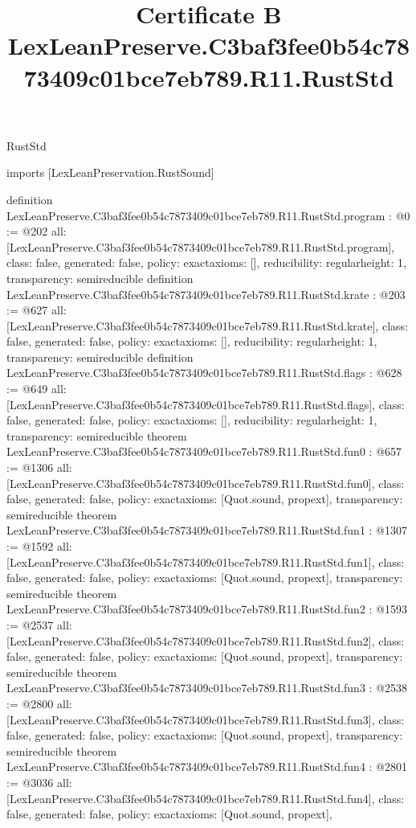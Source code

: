 \begin{lexlean}{RustStd}
\title{Certificate B LexLeanPreserve.C3baf3fee0b54c7873409c01bce7eb789.R11.RustStd}
\begin{coremodule}
imports [LexLeanPreservation.RustSound]

definition LexLeanPreserve.C3baf3fee0b54c7873409c01bce7eb789.R11.RustStd.program : @0 := @202 {
  all: [LexLeanPreserve.C3baf3fee0b54c7873409c01bce7eb789.R11.RustStd.program],
  class: false,
  generated: false,
  policy: exact{axioms: []},
  reducibility: regular{height: 1},
  transparency: semireducible
}
definition LexLeanPreserve.C3baf3fee0b54c7873409c01bce7eb789.R11.RustStd.krate : @203 := @627 {
  all: [LexLeanPreserve.C3baf3fee0b54c7873409c01bce7eb789.R11.RustStd.krate],
  class: false,
  generated: false,
  policy: exact{axioms: []},
  reducibility: regular{height: 1},
  transparency: semireducible
}
definition LexLeanPreserve.C3baf3fee0b54c7873409c01bce7eb789.R11.RustStd.flags : @628 := @649 {
  all: [LexLeanPreserve.C3baf3fee0b54c7873409c01bce7eb789.R11.RustStd.flags],
  class: false,
  generated: false,
  policy: exact{axioms: []},
  reducibility: regular{height: 1},
  transparency: semireducible
}
theorem LexLeanPreserve.C3baf3fee0b54c7873409c01bce7eb789.R11.RustStd.fun0 : @657 := @1306 {
  all: [LexLeanPreserve.C3baf3fee0b54c7873409c01bce7eb789.R11.RustStd.fun0],
  class: false,
  generated: false,
  policy: exact{axioms: [Quot.sound, propext]},
  transparency: semireducible
}
theorem LexLeanPreserve.C3baf3fee0b54c7873409c01bce7eb789.R11.RustStd.fun1 : @1307 := @1592 {
  all: [LexLeanPreserve.C3baf3fee0b54c7873409c01bce7eb789.R11.RustStd.fun1],
  class: false,
  generated: false,
  policy: exact{axioms: [Quot.sound, propext]},
  transparency: semireducible
}
theorem LexLeanPreserve.C3baf3fee0b54c7873409c01bce7eb789.R11.RustStd.fun2 : @1593 := @2537 {
  all: [LexLeanPreserve.C3baf3fee0b54c7873409c01bce7eb789.R11.RustStd.fun2],
  class: false,
  generated: false,
  policy: exact{axioms: [Quot.sound, propext]},
  transparency: semireducible
}
theorem LexLeanPreserve.C3baf3fee0b54c7873409c01bce7eb789.R11.RustStd.fun3 : @2538 := @2800 {
  all: [LexLeanPreserve.C3baf3fee0b54c7873409c01bce7eb789.R11.RustStd.fun3],
  class: false,
  generated: false,
  policy: exact{axioms: [Quot.sound, propext]},
  transparency: semireducible
}
theorem LexLeanPreserve.C3baf3fee0b54c7873409c01bce7eb789.R11.RustStd.fun4 : @2801 := @3036 {
  all: [LexLeanPreserve.C3baf3fee0b54c7873409c01bce7eb789.R11.RustStd.fun4],
  class: false,
  generated: false,
  policy: exact{axioms: [Quot.sound, propext]},
}
\end{coremodule}
\end{lexlean}
